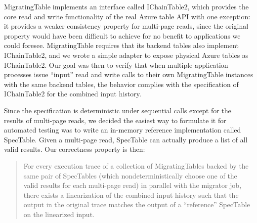 MigratingTable implements an interface called IChainTable2, which provides the core read and write functionality of the real Azure table API with one exception: it provides a weaker consistency property for multi-page reads, since the original property would have been difficult to achieve for no benefit to applications we could foresee.  MigratingTable requires that its backend tables also implement IChainTable2, and we wrote a simple adapter to expose physical Azure tables as IChainTable2.  Our goal was then to verify that when multiple application processes issue ``input'' read and write calls to their own MigratingTable instances with the same backend tables, the behavior complies with the specification of IChainTable2 for the combined input history.

Since the specification is deterministic under sequential calls except for the results of multi-page reads, we decided the easiest way to formulate it for automated testing was to write an in-memory reference implementation called SpecTable.  Given a multi-page read, SpecTable can actually produce a list of all valid results.  Our correctness property is then:
\begin{quote}
For every execution trace of a collection of MigratingTables backed by the same pair of SpecTables (which nondeterministically choose one of the valid results for each multi-page read) in parallel with the migrator job, there exists a linearization of the combined input history such that the output in the original trace matches the output of a ``reference'' SpecTable on the linearized input.
\end{quote}
%
\def\term#1{\emph{#1}}
